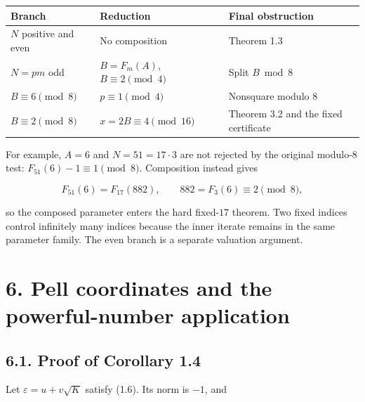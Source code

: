 \documentclass[11pt,a4paper]{article}
\newcounter{none}
\begin{document}
{\def\LTcaptype{none} %
\begin{longtable}[]{@{}
  >{\raggedright\arraybackslash}p{}
  >{\raggedright\arraybackslash}p{}
  >{\raggedright\arraybackslash}p{}@{}}
\toprule\noalign{}
\begin{minipage}[b]{\linewidth}\raggedright
Branch
\end{minipage} & \begin{minipage}[b]{\linewidth}\raggedright
Reduction
\end{minipage} & \begin{minipage}[b]{\linewidth}\raggedright
Final obstruction
\end{minipage} \\
\midrule\noalign{}
\endhead
\bottomrule\noalign{}
\endlastfoot
\(N\) positive and even & No composition & Theorem 1.3 \\
\(N=pm\) odd & \(B=F_m(A)\), \(B\equiv2\pmod4\) & Split \(B\bmod8\) \\
\(B\equiv6\pmod8\) & \(p\equiv1\pmod4\) & Nonsquare modulo \(8\) \\
\(B\equiv2\pmod8\) & \(x=2B\equiv4\pmod{16}\) & Theorem 3.2 and the
fixed certificate \\
\end{longtable}
}

For example, \(A=6\) and \(N=51=17\cdot3\) are not rejected by the
original modulo-\(8\) test: \(F_{51}(6)-1\equiv1\pmod8\). Composition
instead gives

\[
F_{51}(6)=F_{17}(882),
\qquad 882=F_3(6)\equiv2\pmod8,
\]

so the composed parameter enters the hard fixed-\(17\) theorem. Two
fixed indices control infinitely many indices because the inner iterate
remains in the same parameter family. The even branch is a separate
valuation argument.

\section{6. Pell coordinates and the powerful-number
application}\label{pell}

\subsection{6.1. Proof of Corollary 1.4}\label{pell-coordinate}

Let \(\varepsilon=u+v\sqrt K\) satisfy (1.6). Its norm is \(-1\), and
\end{document}
